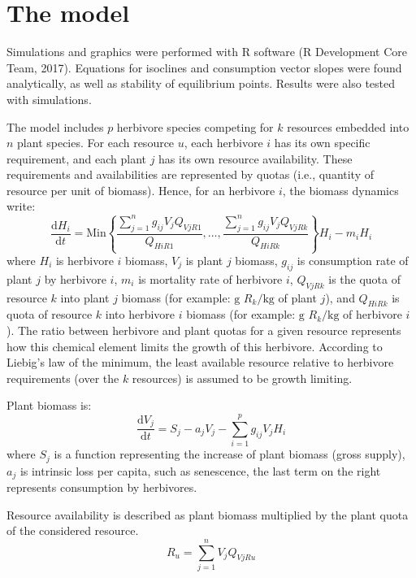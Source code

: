 \documentclass[12pt]{article}
\newcommand\equa[1]{\frac{\mathrm{d}#1}{\mathrm{d}t}}
\begin{document}

\section*{The model}
Simulations and graphics were performed with R software (R Development Core Team, 2017). Equations for isoclines and consumption vector slopes were found analytically, as well as stability of equilibrium points. Results were also tested with simulations. %
\par
The model includes $p$ herbivore species competing for $k$ resources embedded into $n$ plant species. For each resource $u$, each herbivore $i$ has its own specific requirement, and each plant $j$ has %
its own resource availability. These requirements and availabilities are represented by quotas (i.e., quantity of resource per unit of biomass). Hence, for an herbivore $i$, the biomass dynamics write:
\begin{equation}\label{equaherbivoregeneral}
\equa{H_i}=  \mathrm{Min} \left \lbrace \frac{\displaystyle \sum ^n _{j=1} g_{ij} V_j Q_{VjR1}}{Q_{HiR1}}, \ldots,  \frac{\displaystyle \sum ^n _{j=1} g_{ij} V_j Q_{VjRk}}{Q_{HiRk}} \right \rbrace H_i -m_i H_i
\end{equation}
where $H_i$ is herbivore $i$ biomass, $V_j$ is plant $j$ biomass, $g_{ij}$ is consumption rate of plant $j$ by herbivore $i$, $m_i$ is mortality rate of herbivore $i$, $Q_{VjRk}$ is the quota of resource $k$ into plant $j$ biomass (for example: $\text{g }R_k \text{/kg}$ of plant $j$), and $Q_{HiRk}$ is quota of resource $k$ into herbivore $i$ biomass (for example: $\text{g }R_k \text{/kg}$ of herbivore $i$). The ratio between herbivore and plant quotas for a given resource represents how this chemical element limits the growth of this herbivore. According to Liebig's law of the minimum, the least available resource relative to herbivore requirements (over the $k$ resources) is assumed to be growth limiting. \par
Plant biomass is:
\begin{equation}\label{equaplantgeneral}
\equa{V_j}=S_j-a_jV_j-\sum ^p _{i=1} g_{ij}V_jH_i
\end{equation}
where $S_j$ is a function representing the increase of plant biomass (gross supply), $a_j$ is intrinsic loss per capita, such as senescence, the last term on the right represents consumption by herbivores. 
\par
Resource availability is described as plant biomass multiplied by the plant quota of the considered resource.
\begin{equation} \label{equaresourcegeneral}
R_u=\sum ^n _{j=1} V_jQ_{VjRu}
\end{equation}
\end{document}

